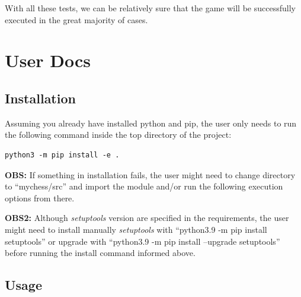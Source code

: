 \documentclass[10pt]{article}
\begin{document}
With all these tests, we can be relatively sure that the game will be successfully
executed in the great majority of cases.



\section{User Docs}

\subsection{Installation}

Assuming you already have installed python and pip, the user only needs to run
the following command inside the top directory of the project:
\begin{lstlisting}
python3 -m pip install -e .
\end{lstlisting}

\textbf{OBS:}
        If something in installation fails, the user might need to change directory to
        ``mychess/src'' and import the module and/or run the following execution options
        from there.

        \textbf{OBS2:} Although \textit{setuptools} version are specified in the requirements, the
        user might need to install manually \textit{setuptools} with ``python3.9 -m pip
        install setuptools'' or upgrade with ``python3.9 -m pip install
        --upgrade setuptools'' before running the install command
        informed above.


\subsection{Usage}
\end{document}
